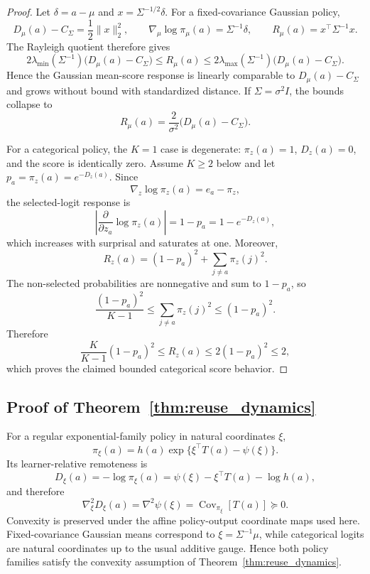 \documentclass{article}
\theoremstyle{plain}
\theoremstyle{definition}
\theoremstyle{remark}
\begin{document}
\begin{proof}
Let \(\delta=a-\mu\) and \(x=\Sigma^{-1/2}\delta\). For a fixed-covariance
Gaussian policy,
\[
D_\mu(a)-C_\Sigma
=
\frac12\|x\|_2^2,
\qquad
\nabla_\mu\log\pi_\mu(a)
=
\Sigma^{-1}\delta,
\qquad
R_\mu(a)
=
x^\top\Sigma^{-1}x.
\]
The Rayleigh quotient therefore gives
\[
2\lambda_{\min}(\Sigma^{-1})
\bigl(D_\mu(a)-C_\Sigma\bigr)
\le
R_\mu(a)
\le
2\lambda_{\max}(\Sigma^{-1})
\bigl(D_\mu(a)-C_\Sigma\bigr).
\]
Hence the Gaussian mean-score response is linearly comparable to
\(D_\mu(a)-C_\Sigma\) and grows without bound with standardized distance.
If \(\Sigma=\sigma^2I\), the bounds collapse to
\[
R_\mu(a)
=
\frac{2}{\sigma^2}
\bigl(D_\mu(a)-C_\Sigma\bigr).
\]

For a categorical policy, the \(K=1\) case is degenerate:
\(\pi_z(a)=1\), \(D_z(a)=0\), and the score is identically zero.
Assume \(K\ge2\) below and let
\(p_a=\pi_z(a)=e^{-D_z(a)}\). Since
\[
\nabla_z\log\pi_z(a)=e_a-\pi_z,
\]
the selected-logit response is
\[
\left|
\frac{\partial}{\partial z_a}\log\pi_z(a)
\right|
=
1-p_a
=
1-e^{-D_z(a)},
\]
which increases with surprisal and saturates at one. Moreover,
\[
R_z(a)
=
(1-p_a)^2+\sum_{j\ne a}\pi_z(j)^2.
\]
The non-selected probabilities are nonnegative and sum to \(1-p_a\), so
\[
\frac{(1-p_a)^2}{K-1}
\le
\sum_{j\ne a}\pi_z(j)^2
\le
(1-p_a)^2.
\]
Therefore
\[
\frac{K}{K-1}(1-p_a)^2
\le
R_z(a)
\le
2(1-p_a)^2
\le
2,
\]
which proves the claimed bounded categorical score behavior.
\end{proof}

\subsection{Proof of Theorem~\ref{thm:reuse_dynamics}}
\label{app:reuse_dynamics}

For a regular exponential-family policy in natural coordinates \(\xi\),
\[
\pi_\xi(a)
=
h(a)\exp\{\xi^\top T(a)-\psi(\xi)\}.
\]
Its learner-relative remoteness is
\[
D_\xi(a)
=
-\log\pi_\xi(a)
=
\psi(\xi)-\xi^\top T(a)-\log h(a),
\]
and therefore
\[
\nabla_\xi^2 D_\xi(a)
=
\nabla^2\psi(\xi)
=
\operatorname{Cov}_{\pi_\xi}[T(a)]
\succeq 0.
\]
Convexity is preserved under the affine policy-output coordinate maps used
here. Fixed-covariance Gaussian means correspond to
\(\xi=\Sigma^{-1}\mu\), while categorical logits are natural coordinates up
to the usual additive gauge. Hence both policy families satisfy the convexity
assumption of Theorem~\ref{thm:reuse_dynamics}.
\end{document}
